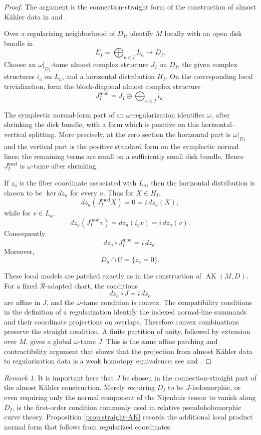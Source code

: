 \documentclass[11pt]{article}
\theoremstyle{definition}
\theoremstyle{remark}
\newtheorem{remark}[theorem]{Remark}
\newcommand{\AK}{\operatorname{AK}}
\begin{document}
\begin{proof}
The argument is the connection-straight form of the construction of almost
K\"ahler data in \cite[\S2]{TMZ-structures} and \cite[\S2]{Tehrani-compact}.

Over a regularizing neighborhood of \(D_I\), identify \(M\) locally with an
open disk bundle in
\[
E_I=\bigoplus_{a\in I}L_a\longrightarrow D_I .
\]
Choose an \(\omega|_{D_I}\)-tame almost complex structure \(J_I\) on \(D_I\),
the given complex structures \(i_a\) on \(L_a\), and a horizontal distribution
\(H_I\). On the corresponding local trivialization, form the block-diagonal
almost complex structure
\[
J_I^{\mathrm{mod}}=J_I\oplus\bigoplus_{a\in I}i_a .
\]

The symplectic normal-form part of an \(\omega\)-regularization identifies
\(\omega\), after shrinking the disk bundle, with a form which is positive on
this horizontal--vertical splitting. More precisely, at the zero section the
horizontal part is \(\omega|_{D_I}\) and the vertical part is the positive
standard form on the symplectic normal lines; the remaining terms are
small on a sufficiently small disk bundle. Hence
\(J_I^{\mathrm{mod}}\) is \(\omega\)-tame after shrinking.

If \(z_a\) is the fiber coordinate associated with \(L_a\), then the horizontal
distribution is chosen to be \(\ker dz_a\) for every \(a\). Thus for
\(X\in H_I\),
\[
dz_a(J_I^{\mathrm{mod}}X)=0=i\,dz_a(X),
\]
while for \(v\in L_a\),
\[
dz_a(J_I^{\mathrm{mod}}v)=dz_a(i_av)=i\,dz_a(v).
\]
Consequently
\[
dz_a\circ J_I^{\mathrm{mod}}=i\,dz_a.
\]
Moreover,
\[
D_a\cap U=\{z_a=0\}.
\]

These local models are patched exactly as in the construction of
\(\AK(M,D)\). For a fixed \(\mathcal R\)-adapted chart, the conditions
\[
dz_a\circ J=i\,dz_a
\]
are affine in \(J\), and the \(\omega\)-tame condition is convex. The
compatibility conditions in the definition of a regularization identify the
indexed normal-line summands and their coordinate projections on overlaps.
Therefore convex combinations preserve the straight condition. A finite
partition of unity, followed by extension over \(M\), gives a global
\(\omega\)-tame \(J\). This is the same affine patching and contractibility
argument that shows that the projection from almost K\"ahler data to
regularization data is a weak homotopy equivalence; see
\cite[discussion after Theorem~7]{TMZ-CR} and
\cite[\S\S1--2]{Tehrani-compact}.
\end{proof}

\begin{remark}
It is important here that \(J\) be chosen in the connection-straight part of
the almost K\"ahler construction. Merely requiring \(D_I\) to be
\(J\)-holomorphic, or even requiring only the normal component of the
Nijenhuis tensor to vanish along \(D_I\), is the first-order condition commonly
used in relative pseudoholomorphic curve theory. Proposition
\ref{prop:straight-AK} records the additional local product normal form that
follows from regularized coordinates.
\end{remark}
\end{document}
